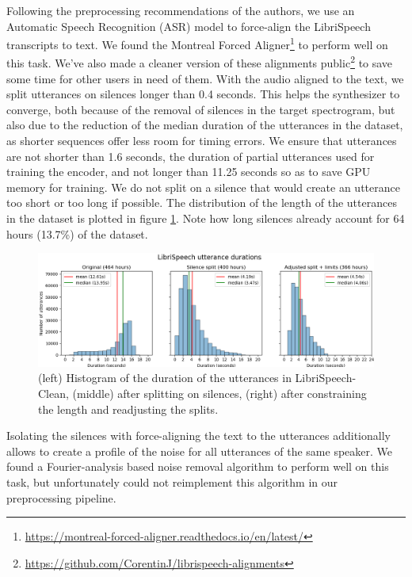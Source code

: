 \documentclass[a4paper, oneside, 12pt, english]{article}
\begin{document}
Following the preprocessing recommendations of the authors, we use an Automatic Speech Recognition (ASR) model to force-align the LibriSpeech transcripts to text. We found the Montreal Forced Aligner\footnote{\url{https://montreal-forced-aligner.readthedocs.io/en/latest/}} to perform well on this task. We've also made a cleaner version of these alignments public\footnote{\url{https://github.com/CorentinJ/librispeech-alignments}} to save some time for other users in need of them. With the audio aligned to the text, we split utterances on silences longer than 0.4 seconds. This helps the synthesizer to converge, both because of the removal of silences in the target spectrogram, but also due to the reduction of the median duration of the utterances in the dataset, as shorter sequences offer less room for timing errors. We ensure that utterances are not shorter than 1.6 seconds, the duration of partial utterances used for training the encoder, and not longer than 11.25 seconds so as to save GPU memory for training. We do not split on a silence that would create an utterance too short or too long if possible. The distribution of the length of the utterances in the dataset is plotted in figure \ref{librispeech_durations}. Note how long silences already account for 64 hours (13.7\%) of the dataset.

\begin{figure}[h]
	\centering
	\includegraphics[width=\linewidth]{images/librispeech_durations.png}
	\caption{(left) Histogram of the duration of the utterances in LibriSpeech-Clean, (middle) after splitting on silences, (right) after constraining the length and readjusting the splits.}
	\label{librispeech_durations}
\end{figure}

Isolating the silences with force-aligning the text to the utterances additionally allows to create a profile of the noise for all utterances of the same speaker. We found a Fourier-analysis based noise removal algorithm to perform well on this task, but unfortunately could not reimplement this algorithm in our preprocessing pipeline.
\end{document}
